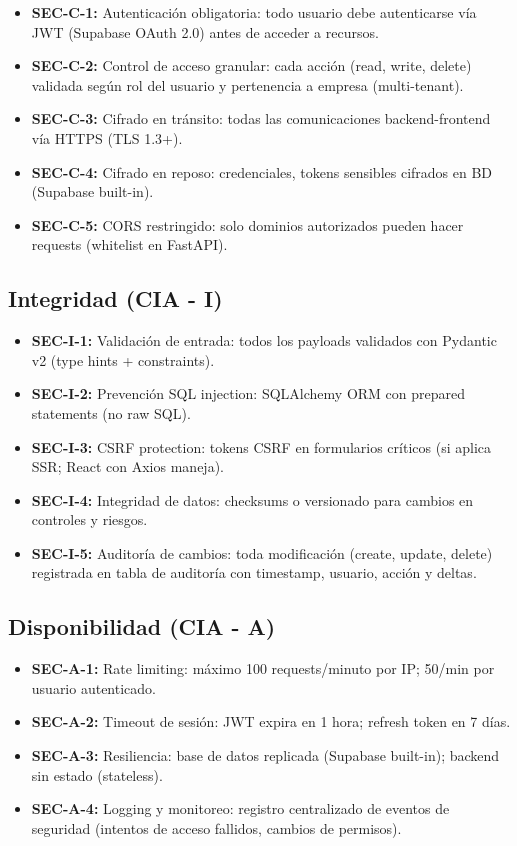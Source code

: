 \documentclass[12pt,a4paper,oneside]{article}
\begin{document}
\begin{itemize}[label=\textcolor{accent}{[SEC-C]}]
  \item \textbf{SEC-C-1:} Autenticación obligatoria: todo usuario debe autenticarse vía JWT (Supabase OAuth 2.0) antes de acceder a recursos.
  \item \textbf{SEC-C-2:} Control de acceso granular: cada acción (read, write, delete) validada según rol del usuario y pertenencia a empresa (multi-tenant).
  \item \textbf{SEC-C-3:} Cifrado en tránsito: todas las comunicaciones backend-frontend vía HTTPS (TLS 1.3+).
  \item \textbf{SEC-C-4:} Cifrado en reposo: credenciales, tokens sensibles cifrados en BD (Supabase built-in).
  \item \textbf{SEC-C-5:} CORS restringido: solo dominios autorizados pueden hacer requests (whitelist en FastAPI).
\end{itemize}

\subsection{Integridad (CIA - I)}

\begin{itemize}[label=\textcolor{success}{[SEC-I]}]
  \item \textbf{SEC-I-1:} Validación de entrada: todos los payloads validados con Pydantic v2 (type hints + constraints).
  \item \textbf{SEC-I-2:} Prevención SQL injection: SQLAlchemy ORM con prepared statements (no raw SQL).
  \item \textbf{SEC-I-3:} CSRF protection: tokens CSRF en formularios críticos (si aplica SSR; React con Axios maneja).
  \item \textbf{SEC-I-4:} Integridad de datos: checksums o versionado para cambios en controles y riesgos.
  \item \textbf{SEC-I-5:} Auditoría de cambios: toda modificación (create, update, delete) registrada en tabla de auditoría con timestamp, usuario, acción y deltas.
\end{itemize}

\subsection{Disponibilidad (CIA - A)}

\begin{itemize}[label=\textcolor{danger}{[SEC-A]}]
  \item \textbf{SEC-A-1:} Rate limiting: máximo 100 requests/minuto por IP; 50/min por usuario autenticado.
  \item \textbf{SEC-A-2:} Timeout de sesión: JWT expira en 1 hora; refresh token en 7 días.
  \item \textbf{SEC-A-3:} Resiliencia: base de datos replicada (Supabase built-in); backend sin estado (stateless).
  \item \textbf{SEC-A-4:} Logging y monitoreo: registro centralizado de eventos de seguridad (intentos de acceso fallidos, cambios de permisos).
\end{itemize}
\end{document}
